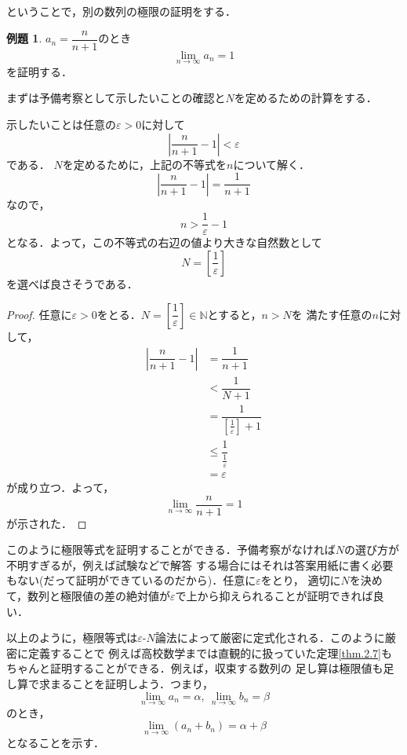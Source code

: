 \documentclass[a4paper,12pt,autodetect-engine,dvipdfmx]{jsarticle}
\theoremstyle{definition}
\newtheorem{exa}[dfn]{例題}
\begin{document}
ということで，別の数列の極限の証明をする．
\begin{exa}
    $a_{n} = \dfrac{n}{n+1}$のとき
    $$\lim_{n \to \infty}a_{n} = 1$$
    を証明する．
\end{exa}
まずは予備考察として示したいことの確認と$N$を定めるための計算をする．

示したいことは任意の$\varepsilon > 0$に対して
$$\left|\dfrac{n}{n+1} - 1\right| < \varepsilon$$
である．
$N$を定めるために，上記の不等式を$n$について解く．
\begin{equation*}
    \left|\dfrac{n}{n+1} - 1\right| = \dfrac{1}{n+1}
\end{equation*}
なので，
\begin{equation*}
    n > \dfrac{1}{\varepsilon} - 1
\end{equation*}
となる．よって，この不等式の右辺の値より大きな自然数として
$$N = \left[\dfrac{1}{\varepsilon}\right]$$
を選べば良さそうである．
\begin{proof}
    任意に$\varepsilon > 0$をとる．$N=\left[\dfrac{1}{\varepsilon}\right] \in \mathbb{N}$とすると，$n>N$を
    満たす任意の$n$に対して，
    \begin{align*}
        \left|\dfrac{n}{n+1} - 1\right| &= \dfrac{1}{n+1}\\
                                        &< \dfrac{1}{N+1}\\
                                        &= \dfrac{1}{[\frac{1}{\varepsilon}] + 1}\\
                                        &\leq \dfrac{1}{\frac{1}{\varepsilon}}\\
                                        &= \varepsilon
    \end{align*}
    が成り立つ．よって，
    \begin{equation*}
        \lim_{n \to \infty}\dfrac{n}{n+1} = 1
    \end{equation*}
    が示された．
\end{proof}
このように極限等式を証明することができる．予備考察がなければ$N$の選び方が不明すぎるが，例えば試験などで解答
する場合にはそれは答案用紙に書く必要もない(だって証明ができているのだから)．任意に$\varepsilon$をとり，
適切に$N$を決めて，数列と極限値の差の絶対値が$\varepsilon$で上から抑えられることが証明できれば良い．

以上のように，極限等式は$\varepsilon$-$N$論法によって厳密に定式化される．このように厳密に定義することで
例えば高校数学までは直観的に扱っていた定理\ref{thm.2.7}もちゃんと証明することができる．例えば，収束する数列の
足し算は極限値も足し算で求まることを証明しよう．つまり，
\begin{equation*}
    \lim_{n \to \infty}a_{n} = \alpha,\ \lim_{n \to \infty}b_{n} = \beta
\end{equation*}
のとき，
\begin{equation*}
    \lim_{n \to \infty}(a_{n} + b_{n}) = \alpha + \beta
\end{equation*}
となることを示す．
\end{document}
